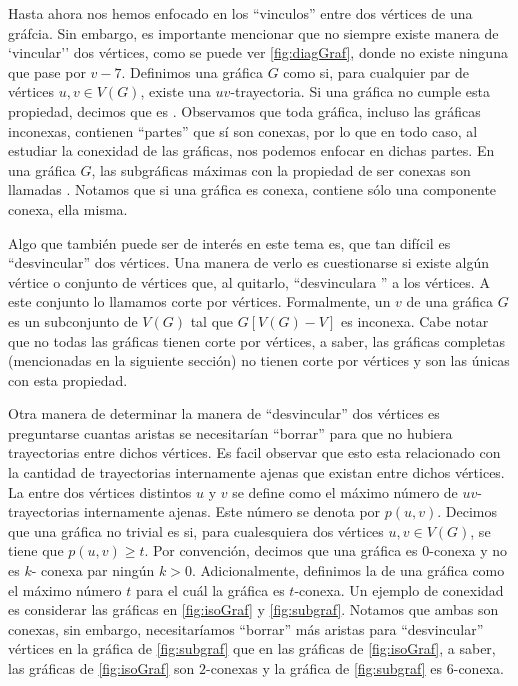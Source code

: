 Hasta ahora nos hemos enfocado en los ``vinculos'' entre dos v\'ertices de una
gr\'afcia. Sin embargo, es importante mencionar que no siempre existe manera de
`vincular'' dos v\'ertices, como se puede ver \cref{fig:diagGraf}, donde no
existe ninguna que pase por $v-7$.  Definimos una gr\'afica $G$ como
 si, para cualquier par de v\'ertices $u,v \in
V(G)$, existe una $uv$-trayectoria. Si una gr\'afica no cumple esta propiedad,
decimos que es . Observamos que toda gr\'afica,
incluso las gr\'aficas inconexas, contienen ``partes'' que s\'i son conexas, por
lo que en todo caso, al estudiar la conexidad de las gr\'aficas, nos podemos
enfocar en dichas partes. En una gr\'afica $G$, las subgr\'aficas
m\'aximas con la propiedad de ser conexas son llamadas . Notamos que si una gr\'afica es conexa, contiene s\'olo una componente
conexa, ella misma. 

Algo que tambi\'en puede ser de inter\'es en este tema es, que tan dif\'icil es
``desvincular'' dos v\'ertices. Una manera de verlo es cuestionarse si existe
alg\'un v\'ertice o conjunto de v\'ertices que, al quitarlo, ``desvinculara '' a
los v\'ertices. A este conjunto lo llamamos corte por v\'ertices. Formalmente,
un  $v$ de una gr\'afica $G$ es un subconjunto de
$V(G)$ tal que $G[V(G)-V]$ es inconexa. Cabe notar que no todas las gr\'aficas
tienen corte por v\'ertices, a saber, las gr\'aficas completas (mencionadas en
la siguiente secci\'on) no tienen corte por v\'ertices y son las \'unicas con
esta propiedad.

Otra manera de determinar la manera de ``desvincular'' dos v\'ertices es
preguntarse cuantas aristas se necesitar\'ian ``borrar'' para que no hubiera
trayectorias entre dichos v\'ertices. Es facil observar que esto esta
relacionado con la cantidad de trayectorias internamente ajenas que existan
entre dichos v\'ertices. La  entre dos v\'ertices
distintos $u$ y $v$ se define como el m\'aximo n\'umero de $uv$-trayectorias
internamente ajenas. Este n\'umero se denota por $p(u,v)$. Decimos que una
gr\'afica no trivial es  si, para cualesquiera
dos v\'ertices $u,v \in V(G)$, se tiene que $p(u,v) \geq t$. Por convenci\'on,
decimos que una gr\'afica es $0$-conexa y no es $k$- conexa par ning\'un $k>0$.
Adicionalmente, definimos la  de una gr\'afica como el
m\'aximo n\'umero $t$ para el cu\'al la gr\'afica es $t$-conexa. Un ejemplo de
conexidad es considerar las gr\'aficas en \cref{fig:isoGraf} y
\cref{fig:subgraf}. Notamos que ambas son conexas, sin embargo, necesitar\'iamos
``borrar'' m\'as aristas para ``desvincular'' v\'ertices en la gr\'afica de
\cref{fig:subgraf} que en las gr\'aficas de \cref{fig:isoGraf}, a saber, las
gr\'aficas de \cref*{fig:isoGraf} son $2$-conexas y la gr\'afica de
\cref{fig:subgraf} es $6$-conexa.

